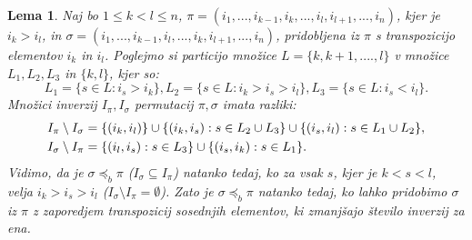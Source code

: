 \documentclass[a4paper, 12pt]{book}
\newtheorem{lema}{Lema}[chapter]
\begin{document}
\begin{lema}
    Naj bo $1 \leq k < l \leq n$, $\pi = (i_1, ..., i_{k-1}, i_k, ..., i_l, i_{l+1}, ..., i_n)$, kjer je $i_k > i_l$, in $\sigma = (i_1, ..., i_{k-1}, i_l, ..., i_k, i_{l+1}, ..., i_n)$, pridobljena iz $\pi$ s transpozicijo elementov $i_k$ in $i_l$. Poglejmo si particijo množice $L = \{ k, k+ 1, ...., l\}$ v množice $L_1, L_2, L_3$ in $\{ k, l \}$, kjer so:
    \[
        L_1 = \{ s \in L: i_s > i_k \}, L_2 = \{ s \in L: i_k > i_s > i_l \}, L_3 = \{ s \in L: i_s < i_l \}.
    \]
    Množici inverzij $I_{\pi}, I_{\sigma}$ permutacij $\pi, \sigma$ imata razliki:
    \begin{align}
        I_{\pi} \setminus I_{\sigma} &= \{ (i_k, i_l) \} \cup \{ (i_k, i_s): s \in L_2 \cup L_3 \} \cup \{ (i_s, i_l): s \in L_1 \cup L_2 \}, \notag \\
        I_{\sigma} \setminus I_{\pi} &= \{ (i_l, i_s): s \in L_3 \} \cup \{ (i_s, i_k): s \in L_1 \}. \notag
    \end{align}
    Vidimo, da je $\sigma \preceq_b \pi$ ($I_{\sigma} \subseteq I_{\pi}$) natanko tedaj, ko za vsak $s$, kjer je $k < s < l$, velja $i_k > i_s > i_l$ ($I_{\sigma} \setminus I_{\pi} = \emptyset$). Zato je $\sigma \preceq_b \pi$ natanko tedaj, ko lahko pridobimo $\sigma$ iz $\pi$ z zaporedjem transpozicij sosednjih elementov, ki zmanjšajo število inverzij za ena.
\end{lema}
\end{document}
